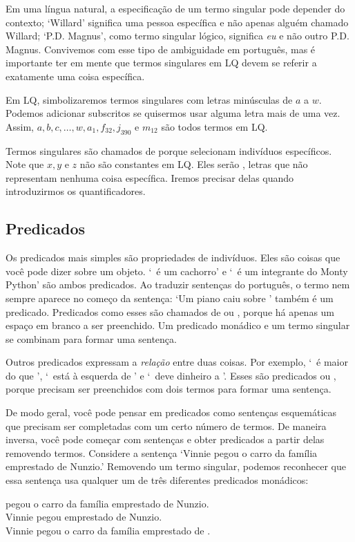 Em uma língua natural, a especificação de um termo singular pode depender do contexto; `Willard' significa uma pessoa específica e não apenas alguém chamado Willard; `P.D. Magnus', como termo singular lógico, significa \emph{eu} e não outro P.D. Magnus. Convivemos com esse tipo de ambiguidade em português, mas é importante ter em mente que termos singulares em LQ devem se referir a exatamente uma coisa específica.

Em LQ, simbolizaremos termos singulares com letras minúsculas de $a$ a $w$. Podemos adicionar subscritos se quisermos usar alguma letra mais de uma vez. Assim, $a,b,c,\ldots,w, a_1, f_{32}, j_{390}$ e $m_{12}$ são todos termos em LQ.

Termos singulares são chamados de  porque selecionam indivíduos específicos. Note que $x, y$ e $z$ não são constantes em LQ. Eles serão , letras que não representam nenhuma coisa específica. Iremos precisar delas quando introduzirmos os quantificadores.

\subsection{Predicados}
Os predicados mais simples são propriedades de indivíduos. Eles são coisas que você pode dizer sobre um objeto. `\blank\ é um cachorro' e `\blank\ é um integrante do Monty Python' são ambos predicados. Ao traduzir sentenças do português, o termo nem sempre aparece no começo da sentença: `Um piano caiu sobre \blank' também é um predicado. Predicados como esses são chamados de  ou , porque há apenas um espaço em branco a ser preenchido. Um predicado monádico e um termo singular se combinam para formar uma sentença.

Outros predicados expressam a \emph{relação} entre duas coisas. Por exemplo, `\blank\ é maior do que \blank', `\blank\ está à esquerda de \blank' e `\blank\ deve dinheiro a \blank'. Esses são predicados  ou , porque precisam ser preenchidos com dois termos para formar uma sentença.

De modo geral, você pode pensar em predicados como sentenças esquemáticas que precisam ser completadas com um certo número de termos. De maneira inversa, você pode começar com sentenças e obter predicados a partir delas removendo termos. Considere a sentença `Vinnie pegou o carro da família emprestado de Nunzio.' Removendo um termo singular, podemos reconhecer que essa sentença usa qualquer um de três diferentes predicados monádicos:
\begin{center}
\blank pegou o carro da família emprestado de Nunzio.\\
Vinnie pegou \blank emprestado de Nunzio.\\
Vinnie pegou o carro da família emprestado de \blank.
\end{center}

